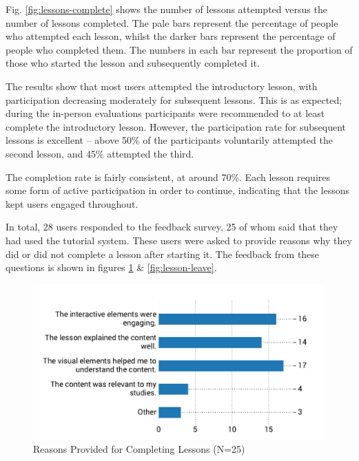 \documentclass[bsc,twoside,singlespacing,parskip,logo,notimes,normalheadings]{infthesis}
\begin{document}
    Fig. \ref{fig:lessons-complete} shows the number of lessons
    attempted versus the number of lessons completed. The pale bars
    represent the percentage of people who attempted each lesson,
    whilst the darker bars represent the percentage of people who
    completed them. The numbers in each bar represent the proportion
    of those who started the lesson and subsequently completed it.

    The results show that most users attempted the introductory
    lesson, with participation decreasing moderately for subsequent
    lessons. This is as expected; during the in-person evaluations
    participants were recommended to at least complete the
    introductory lesson. However, the participation rate for
    subsequent lessons is excellent -- above 50\% of the participants
    voluntarily attempted the second lesson, and 45\% attempted the
    third.

    The completion rate is fairly consistent, at around 70\%. Each
    lesson requires some form of active participation in order to
    continue, indicating that the lessons kept users engaged
    throughout.

    In total, 28 users responded to the feedback survey, 25 of whom
    said that they had used the tutorial system. These users were
    asked to provide reasons why they did or did not complete a lesson
    after starting it. The feedback from these questions is shown in
    figures \ref{fig:lesson-stay} \& \ref{fig:lesson-leave}.

    \begin{figure}[!htb]
      \centering
      \captionsetup{width=\textwidth, justification=centering}
      \caption{Reasons Provided for Completing Lessons (N=25)}\label{fig:lesson-stay}
      \includegraphics[width=\textwidth, trim=0 10 0 45, clip]{img/lesson_staying.pdf}
    \end{figure}
\end{document}
